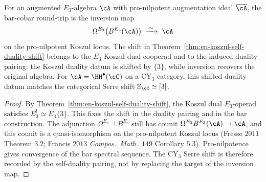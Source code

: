 \begin{corollary}
\label{cor:e3-bar-cobar-shift}
For an augmented $E_3$-algebra $\cA$ with pro-nilpotent augmentation
ideal $\overline{\cA}$, the bar-cobar round-trip is the inversion map
\[
 \Omega^{E_3}\bigl(B^{E_3}(\cA)\bigr) \;\xrightarrow{\;\sim\;}\; \cA
\]
on the pro-nilpotent Koszul locus. The shift in
Theorem~\ref{thm:en-koszul-self-duality-shift} belongs to the
$E_3$ Koszul dual cooperad and to the induced duality pairing:
the Koszul duality datum is shifted by $\{3\}$, while inversion
recovers the original algebra. For
$\cA=\HH^\bullet(\cC)$ on a CY$_3$ category, this shifted duality datum
matches the categorical Serre shift $\mathbb{S}_\cC\simeq[3]$.
\end{corollary}

\begin{proof}
By Theorem~\ref{thm:en-koszul-self-duality-shift}, the Koszul dual
$E_3$-operad satisfies $E_3^{!}\simeq E_3\{3\}$. This fixes the shift
in the duality pairing and in the bar construction. The adjunction
$\Omega^{E_3}\dashv B^{E_3}$ still has counit
$\Omega^{E_3}B^{E_3}(\cA)\to\cA$, and this counit is a quasi-isomorphism
on the pro-nilpotent Koszul locus (Fresse $2011$ Theorem $3.2$;
Francis $2013$ \textit{Compos.~Math.}~$149$ Corollary $5.3$).
Pro-nilpotence gives convergence of the bar spectral sequence. The
CY$_3$ Serre shift is therefore recorded by the self-duality pairing,
not by replacing the target of the inversion map.
\end{proof}

